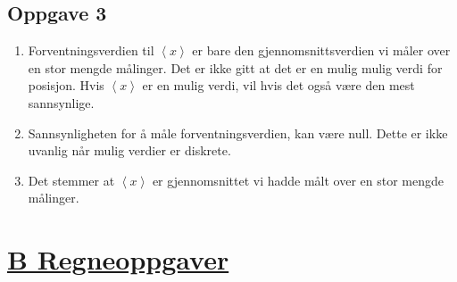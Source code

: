 \documentclass{article}
\begin{document}
\subsection*{Oppgave 3}
\begin{enumerate}[\bf A:]
    \item Forventningsverdien til $\left<x\right>$ er bare den gjennomsnittsverdien vi måler over en stor mengde målinger. Det er ikke gitt at det er en mulig mulig verdi for posisjon. Hvis $\left<x\right>$ er en mulig verdi, vil hvis det også være den mest sannsynlige. 
    \item Sannsynligheten for å måle forventningsverdien, kan være null. Dette er ikke uvanlig når mulig verdier er diskrete. 
    \item Det stemmer at $\left<x\right>$ er gjennomsnittet vi hadde målt over en stor mengde målinger.
\end{enumerate}
\section*{\underline{B Regneoppgaver}}
\end{document}
